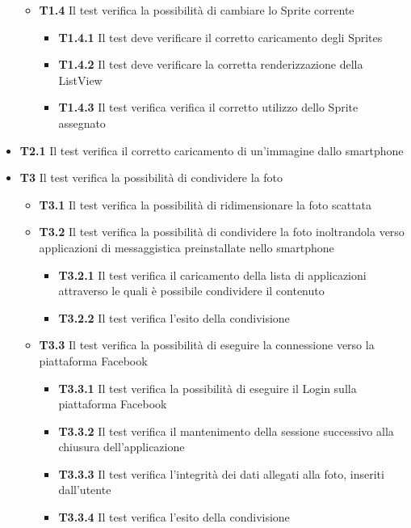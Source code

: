 \begin{itemize}
\begin{itemize}
\item \textbf{T1.4} Il test verifica la possibilità di cambiare lo Sprite corrente
\begin{itemize}
\item \textbf{T1.4.1} Il test deve verificare il corretto caricamento degli Sprites
\item \textbf{T1.4.2} Il test deve verificare la corretta renderizzazione della ListView
\item \textbf{T1.4.3} Il test verifica verifica il corretto utilizzo dello Sprite assegnato
\end{itemize}
\end{itemize}
\item \textbf{T2.1} Il test verifica il corretto caricamento di un'immagine dallo smartphone
\item \textbf{T3} Il test verifica la possibilità di condividere la foto
\begin{itemize}
\item \textbf{T3.1} Il test verifica la possibilità di ridimensionare la foto scattata
\item \textbf{T3.2} Il test verifica la possibilità di condividere la foto inoltrandola verso applicazioni di messaggistica preinstallate nello smartphone
\begin{itemize}
\item \textbf{T3.2.1} Il test verifica il caricamento della lista di applicazioni attraverso le quali è possibile condividere il contenuto
\item \textbf{T3.2.2} Il test verifica l'esito della condivisione
\end{itemize}
\item \textbf{T3.3} Il test verifica la possibilità di eseguire la connessione verso la piattaforma Facebook
\begin{itemize}
\item \textbf{T3.3.1} Il test verifica la possibilità di eseguire il Login sulla piattaforma Facebook
\item \textbf{T3.3.2} Il test verifica il mantenimento della sessione successivo alla chiusura dell'applicazione
\item \textbf{T3.3.3} Il test verifica l'integrità dei dati allegati alla foto, inseriti dall'utente
\item \textbf{T3.3.4} Il test verifica l'esito della condivisione
\end{itemize}
\end{itemize}
\end{itemize}

